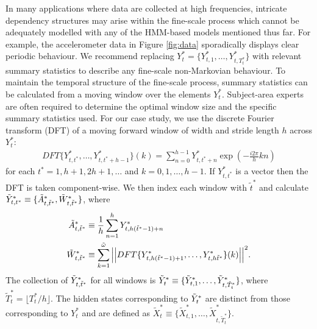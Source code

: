 In many applications where data are collected at high frequencies, intricate dependency structures may arise within the fine-scale process which cannot be adequately modelled with any of the HMM-based models mentioned thus far. For example, the accelerometer data in Figure \ref{fig:data} sporadically displays clear periodic behaviour. We recommend replacing $Y_t^* = \{Y^*_{t,1},\ldots,Y^*_{t,T^*_t}\}$ with relevant summary statistics to describe any fine-scale non-Markovian behaviour. To maintain the temporal structure of the fine-scale process, summary statistics can be calculated from a moving window over the elements $Y_t^*$. Subject-area experts are often required to determine the optimal window size and the specific summary statistics used. For our case study, we use the discrete Fourier transform (DFT) of a moving forward window of width and stride length $h$ across $Y^*_t$:
%
\begin{align*}
    DFT\{Y^*_{t,t^*},\ldots, Y^*_{t,t^*+h-1}\}(k) = \sum_{n=0}^{h-1} Y^*_{t,t^*+n}\exp\left(-\frac{i 2\pi}{h} kn \right)
\end{align*}
%
for each $t^* = 1,h+1,2h+1,\ldots$ and $k = 0,1,\ldots, h-1$. If $Y^*_{t,t^*}$ is a vector then the DFT is taken component-wise. We then index each window with $\tilde t^*$ and calculate $\tilde{Y}^*_{t,t^*} \equiv \{\tilde{A}^*_{t,\tilde t^*},\tilde{W}^*_{t,\tilde t^*}\}$, where
%
\begin{equation}
\begin{split}
    \label{eqn:z}
    \Zone_{t,\tilde t^*} &\equiv \frac{1}{h}\sum_{n=1}^{h}Y^*_{t,h(\tilde t^*-1)+n} \\
    \Ztwo_{t,\tilde t^*} &\equiv \sum_{k=1}^{\tilde{\omega}}\Big|\Big|DFT\{Y^*_{t,h(\tilde t^*-1) + 1},\ldots, Y^*_{t,h\tilde t^*}\}(k)\Big|\Big|^2.
\end{split}
\end{equation}
%
The collection of $\tilde{Y}^*_{t,\tilde t^*}$ for all windows is $\tilde{Y}^*_t \equiv \{\tilde{Y}^*_{t,1},\ldots,\tilde{Y}^*_{t,\tilde T_t^*}\}$, where $\tilde T_t^* = \lfloor T^*_t/h \rfloor$. The hidden states corresponding to $\tilde{Y}^*_t$ are distinct from those corresponding to $Y^*_t$ and are defined as $\tilde X^*_t \equiv \{\tilde X^*_{t,1},\ldots,\tilde X^*_{t,\tilde T_t^*}\}$.

